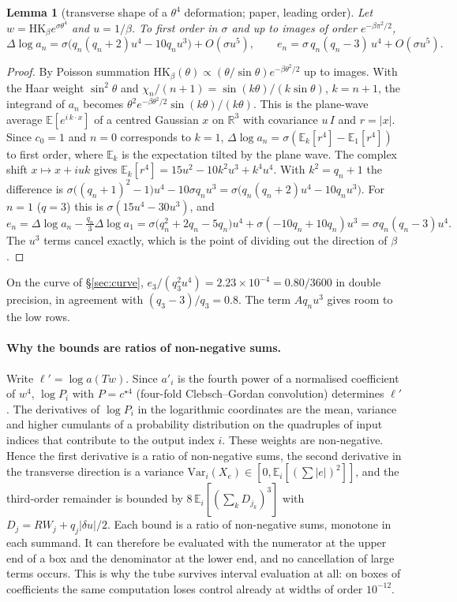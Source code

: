 \documentclass[11pt,a4paper]{article}
\newtheorem{lemma}[theorem]{Lemma}
\theoremstyle{definition}
\theoremstyle{remark}
\newcommand{\R}{\mathbb{R}}
\newcommand{\HK}{\mathrm{HK}}
\begin{document}
\begin{lemma}[transverse shape of a $\theta^4$ deformation; paper, leading order]\label{lem:shape}
Let $w=\HK_\beta e^{\sigma\theta^4}$ and $u=1/\beta$. To first order in $\sigma$ and up to images of order $e^{-\beta\pi^2/2}$,
\[
\Delta\log a_n=\sigma\bigl(q_n(q_n+2)u^4-10q_nu^3\bigr)+O(\sigma u^5),\qquad e_n=\sigma\,q_n(q_n-3)\,u^4+O(\sigma u^5).
\]
\end{lemma}
\begin{proof}
By Poisson summation $\HK_\beta(\theta)\propto(\theta/\sin\theta)e^{-\beta\theta^2/2}$ up to images.
With the Haar weight $\sin^2\theta$ and $\chi_n/(n+1)=\sin(k\theta)/(k\sin\theta)$, $k=n+1$, the integrand of $a_n$ becomes $\theta^2e^{-\beta\theta^2/2}\sin(k\theta)/(k\theta)$.
This is the plane-wave average $\mathbb{E}[e^{i\,k\cdot x}]$ of a centred Gaussian $x$ on $\R^3$ with covariance $u\,I$ and $r=|x|$.
Since $c_0=1$ and $n=0$ corresponds to $k=1$, $\Delta\log a_n=\sigma(\mathbb{E}_k[r^4]-\mathbb{E}_1[r^4])$ to first order, where $\mathbb{E}_k$ is the expectation tilted by the plane wave.
The complex shift $x\mapsto x+iuk$ gives $\mathbb{E}_k[r^4]=15u^2-10k^2u^3+k^4u^4$.
With $k^2=q_n+1$ the difference is $\sigma\bigl((q_n+1)^2-1\bigr)u^4-10\sigma q_nu^3=\sigma\bigl(q_n(q_n+2)u^4-10q_nu^3\bigr)$.
For $n=1$ ($q=3$) this is $\sigma(15u^4-30u^3)$, and
\[
e_n=\Delta\log a_n-\tfrac{q_n}3\Delta\log a_1=\sigma\bigl(q_n^2+2q_n-5q_n\bigr)u^4+\sigma(-10q_n+10q_n)u^3=\sigma q_n(q_n-3)u^4 .
\]
The $u^3$ terms cancel exactly, which is the point of dividing out the direction of $\beta$.
\end{proof}
On the curve of \S\ref{sec:curve}, $e_3/(q_3^2u^4)=2.23\times10^{-4}=0.80/3600$ in double precision, in agreement with $(q_3-3)/q_3=0.8$.
The term $Aq_nu^3$ gives room to the low rows.

\paragraph{Why the bounds are ratios of non-negative sums.}
Write $\ell'=\log a(Tw)$.
Since $a'_i$ is the fourth power of a normalised coefficient of $w^4$, $\log P_i$ with $P=c^{\star4}$ (four-fold Clebsch--Gordan convolution) determines $\ell'$.
The derivatives of $\log P_i$ in the logarithmic coordinates are the mean, variance and higher cumulants of a probability distribution on the quadruples of input indices that contribute to the output index $i$.
These weights are non-negative.
Hence the first derivative is a ratio of non-negative sums, the second derivative in the transverse direction is a variance $\mathrm{Var}_i(X_e)\in[0,\mathbb{E}_i[(\sum|e|)^2]]$, and the third-order remainder is bounded by $8\,\mathbb{E}_i[(\sum_k D_{j_k})^3]$ with $D_j=RW_j+q_j|\delta u|/2$.
Each bound is a ratio of non-negative sums, monotone in each summand.
It can therefore be evaluated with the numerator at the upper end of a box and the denominator at the lower end, and no cancellation of large terms occurs.
This is why the tube survives interval evaluation at all: on boxes of coefficients the same computation loses control already at widths of order $10^{-12}$.
\end{document}
